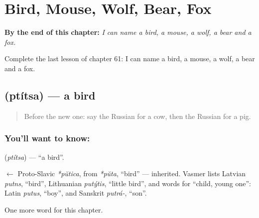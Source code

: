 
\chapter{Bird, Mouse, Wolf, Bear, Fox}
\label{ch:ru-bird-mouse-wolf-bear-fox}

\begin{chapteropening}
\textbf{By the end of this chapter:} \emph{I can name a bird, a mouse, a wolf, a bear and a fox.}

Complete the last lesson of chapter 61: I can name a bird, a mouse, a wolf, a bear and a fox.
\end{chapteropening}

\section[\texorpdfstring{\ru{птица} (ptítsa)}{птица (ptítsa)}]{ (ptítsa) — a bird}

\label{lesson:RU-C61-bird}



\begin{quote}
Before the new one: say the Russian for a cow, then the Russian for a pig.
\end{quote}

\subsection*{You'll want to know: }
\textbf{} (\emph{ptítsa}) — \textquotedblleft{}a bird\textquotedblright{}.

\begin{cousinweb}
\textbf{} $\leftarrow$ Proto-Slavic \emph{*pŭtica}, from \emph{*pŭta}, \textquotedblleft{}bird\textquotedblright{} — inherited. Vasmer lists Latvian \emph{putns}, \textquotedblleft{}bird\textquotedblright{}, Lithuanian \emph{putýtis}, \textquotedblleft{}little bird\textquotedblright{}, and words for \textquotedblleft{}child, young one\textquotedblright{}: Latin \emph{putus}, \textquotedblleft{}boy\textquotedblright{}, and Sanskrit \emph{putrá-}, \textquotedblleft{}son\textquotedblright{}.
\end{cousinweb}

\begin{grammarlens}[title={What you've built}]
One more word for this chapter.
\end{grammarlens}

